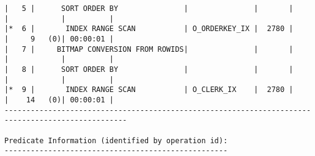 \documentclass[11pt,a4paper,parskip=half]{scrartcl}
\begin{document}
\begin{lstlisting}
|   5 |      SORT ORDER BY               |               |       |       |            |          |                                                                                                                                                                                                           
|*  6 |       INDEX RANGE SCAN           | O_ORDERKEY_IX |  2780 |       |     9   (0)| 00:00:01 |                                                                                                                                                                                                           
|   7 |     BITMAP CONVERSION FROM ROWIDS|               |       |       |            |          |                                                                                                                                                                                                           
|   8 |      SORT ORDER BY               |               |       |       |            |          |                                                                                                                                                                                                           
|*  9 |       INDEX RANGE SCAN           | O_CLERK_IX    |  2780 |       |    14   (0)| 00:00:01 |                                                                                                                                                                                                           
--------------------------------------------------------------------------------------------------                                                                                                                                                                                                           
                                                                                                                                                                                                                                                                                                             
Predicate Information (identified by operation id):                                                                                                                                                                                                                                                          
---------------------------------------------------                                                                                                                                                                                                                                                          
                                                                                                                                                                                                                                                                                                             

\end{lstlisting}
\end{document}
